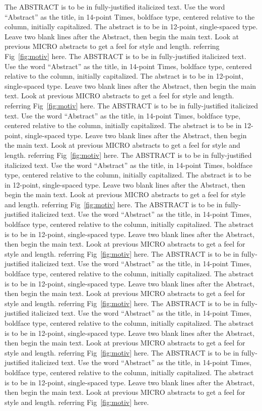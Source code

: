 The ABSTRACT is to be in fully-justified italicized text. Use the word ``Abstract'' as the title, in
14-point Times, boldface type, centered relative to the column, initially capitalized. The abstract
is to be in 12-point, single-spaced type. Leave two blank lines after the Abstract, then begin the
main text. Look at previous MICRO abstracts to get a feel for style and length. referring
Fig~\ref{fig:motiv} here. The ABSTRACT is to be in fully-justified italicized text. Use the word
``Abstract'' as the title, in 14-point Times, boldface type, centered relative to the column,
initially capitalized. The abstract is to be in 12-point, single-spaced type. Leave two blank lines
after the Abstract, then begin the main text. Look at previous MICRO abstracts to get a feel for
style and length. referring Fig~\ref{fig:motiv} here. The ABSTRACT is to be in fully-justified
italicized text. Use the word ``Abstract'' as the title, in 14-point Times, boldface type, centered
relative to the column, initially capitalized. The abstract is to be in 12-point, single-spaced type.
Leave two blank lines after the Abstract, then begin the main text. Look at previous MICRO abstracts
to get a feel for style and length. referring Fig~\ref{fig:motiv} here. The ABSTRACT is to be in
fully-justified italicized text. Use the word ``Abstract'' as the title, in 14-point Times, boldface
type, centered relative to the column, initially capitalized. The abstract is to be in 12-point,
single-spaced type. Leave two blank lines after the Abstract, then begin the main text. Look at
previous MICRO abstracts to get a feel for style and length. referring Fig~\ref{fig:motiv} here. The
ABSTRACT is to be in fully-justified italicized text. Use the word ``Abstract'' as the title, in
14-point Times, boldface type, centered relative to the column, initially capitalized. The abstract
is to be in 12-point, single-spaced type. Leave two blank lines after the Abstract, then begin the
main text. Look at previous MICRO abstracts to get a feel for style and length. referring
Fig~\ref{fig:motiv} here. The ABSTRACT is to be in fully-justified italicized text. Use the word
``Abstract'' as the title, in 14-point Times, boldface type, centered relative to the column,
initially capitalized. The abstract is to be in 12-point, single-spaced type. Leave two blank lines
after the Abstract, then begin the main text. Look at previous MICRO abstracts to get a feel for
style and length. referring Fig~\ref{fig:motiv} here. The ABSTRACT is to be in fully-justified
italicized text. Use the word ``Abstract'' as the title, in 14-point Times, boldface type, centered
relative to the column, initially capitalized. The abstract is to be in 12-point, single-spaced type.
Leave two blank lines after the Abstract, then begin the main text. Look at previous MICRO abstracts
to get a feel for style and length. referring Fig~\ref{fig:motiv} here. The ABSTRACT is to be in
fully-justified italicized text. Use the word ``Abstract'' as the title, in 14-point Times, boldface
type, centered relative to the column, initially capitalized. The abstract is to be in 12-point,
single-spaced type. Leave two blank lines after the Abstract, then begin the main text. Look at
previous MICRO abstracts to get a feel for style and length. referring Fig~\ref{fig:motiv} here.

